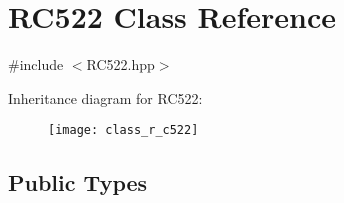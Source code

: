 \hypertarget{class_r_c522}{}\section{R\+C522 Class Reference}
\label{class_r_c522}


{\ttfamily \#include $<$R\+C522.\+hpp$>$}

Inheritance diagram for R\+C522\+:\begin{figure}[H]
\begin{center}
\leavevmode
\texttt{[image: class\_r\_c522]}
\end{center}
\end{figure}
\subsection*{Public Types}

